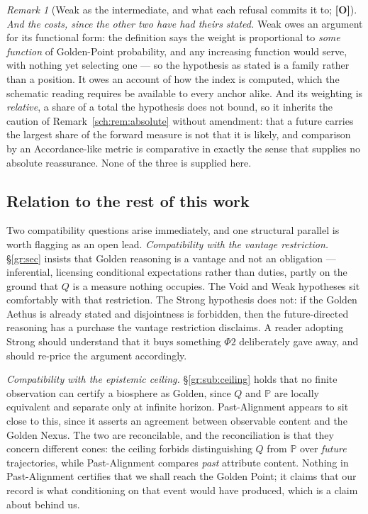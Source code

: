 \documentclass[11pt]{article}
\numberwithin{equation}{section}
\theoremstyle{plain}
\theoremstyle{definition}
\theoremstyle{remark}
\newtheorem{remark}[theorem]{Remark}
\newcommand{\PP}{\mathbb{P}}
\begin{document}
\begin{remark}[Weak as the intermediate, and what each refusal commits
it to; \textbf{[O]}]
\emph{And the costs, since the other two have had theirs stated.} Weak
owes an argument for its functional form: the definition says the weight
is proportional to \emph{some function} of Golden-Point probability, and
any increasing function would serve, with nothing yet selecting one ---
so the hypothesis as stated is a family rather than a position. It owes
an account of how the index is computed, which the schematic reading
requires be available to every anchor alike. And its weighting is
\emph{relative}, a share of a total the hypothesis does not bound, so it inherits the caution of Remark~\ref{sch:rem:absolute} without
amendment: that a future carries the largest share of the forward
measure is not that it is likely, and comparison by an Accordance-like
metric is comparative in exactly the sense that supplies no absolute
reassurance. None of the three is supplied here.
\end{remark}

\subsection{Relation to the rest of this work}\label{gc:sub:relation}

Two compatibility questions arise immediately, and one structural
parallel is worth flagging as an open lead. \emph{Compatibility with the vantage restriction.}
\S\ref{gr:sec} insists that Golden reasoning is a vantage and not an
obligation --- inferential, licensing conditional expectations rather
than duties, partly on the ground that $Q$ is a measure nothing
occupies. The Void and Weak hypotheses sit comfortably with that
restriction. The Strong hypothesis does not: if the Golden Aethus is
already stated and disjointness is forbidden, then the future-directed
reasoning has a purchase the vantage restriction disclaims. A reader
adopting Strong should understand that it buys something
$\Phi2$ deliberately gave away, and should re-price the argument
accordingly.

\emph{Compatibility with the epistemic ceiling.}
\S\ref{gr:sub:ceiling} holds that no finite observation can certify a
biosphere as Golden, since $Q$ and $\PP$ are locally equivalent and
separate only at infinite horizon. Past-Alignment appears to sit close
to this, since it asserts an agreement between observable content and
the Golden Nexus. The two are reconcilable, and the reconciliation is
that they concern different cones: the ceiling forbids distinguishing
$Q$ from $\PP$ over \emph{future} trajectories, while Past-Alignment
compares \emph{past} attribute content. Nothing in Past-Alignment
certifies that we shall reach the Golden Point; it claims that our
record is what conditioning on that event would have produced, which is
a claim about behind us.
\end{document}
